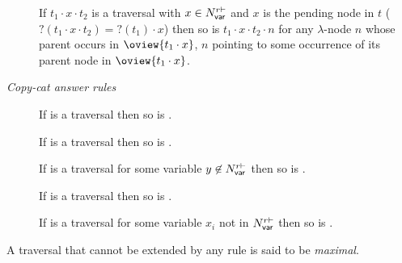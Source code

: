 \begin{definition}
\begin{description}
\item[] If $t_1 \cdot x \cdot t_2$ is a traversal with
  $x \in N_{\sf var}^{r\vdash}$ and $x$ is the pending node in $t$ ($?(t_1 \cdot x \cdot
  t_2)=?(t_1) \cdot x$) then so is $t_1 \cdot x \cdot t_2 \cdot
  n$ for any $\lambda$-node $n$ whose parent occurs in
  $\oview{t_1 \cdot x}$, $n$ pointing to some occurrence of its
  parent node in $\oview{t_1 \cdot x}$.
\end{description}

\noindent \emph{Copy-cat answer rules}
\begin{description}
\item[]
  If 
is a traversal then so is .

\item[] If 
is a traversal then so is .

\item[] If  is a
traversal for some variable $y\not\in N_{\sf var}^{r\vdash}$ then so is .

\item[] If 
is a traversal then so is .
\end{description}

\begin{description}
\item[]
If  is a traversal for some variable
    $x_i$ not in $N_{\sf var}^{r\vdash}$ then
so is .
\end{description}
A traversal that cannot be extended by any rule is said to be \emph{maximal}.
\end{definition}


